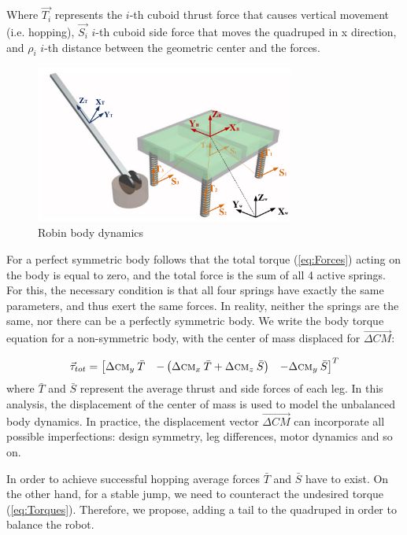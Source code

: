 Where $\vec{T_{i}}$ represents the $i$-th cuboid thrust force that causes vertical movement (i.e. hopping), $\vec{S_{i}}$ $i$-th cuboid side force that moves the quadruped in x direction, and $\rho _i$ $i$-th distance between the geometric center and the forces.

\begin{figure}
	\centering
	\includegraphics[width=85mm]{./pictures/RobinMoment.pdf}
	\caption{Robin body dynamics}
	\label{fig:rmoment}
\end{figure}

For a perfect symmetric body follows that the total torque (\ref{eq:Forces}) acting on the body is equal to zero, and the total force is the sum of all 4 active springs. For this, the necessary condition is that all four springs have exactly the same parameters, and thus exert the same forces. In reality, neither the springs are the same, nor there can be a perfectly symmetric body. We write the body torque equation for a non-symmetric body, with the center of mass displaced for $\vec{\Delta CM}$:

\begin{equation}\label{eq:Torques}
\vec{\tau}_{tot}=\begin{bmatrix}
\Delta \textsc{cm}_y \:\bar{T} & -\left ( \Delta \textsc{cm}_x \:\bar{T} +\Delta \textsc{cm}_z \:\bar{S}\right ) & -\Delta \textsc{cm}_y \:\bar{S}
\end{bmatrix}^T
\end{equation}
where $\bar{T}$ and $\bar{S}$ represent the average thrust and side forces of each leg. In this analysis, the displacement of the center of mass is used to model the unbalanced body dynamics. In practice, the displacement vector  $\vec{\Delta CM}$ can incorporate all possible imperfections: design symmetry, leg differences, motor dynamics and so on.  

In order to achieve successful hopping average forces $\bar{T}$ and $\bar{S}$ have to exist. On the other hand, for a stable jump, we need to counteract the undesired torque (\ref{eq:Torques}). Therefore, we propose, adding a tail to the quadruped in order to balance the robot. 
